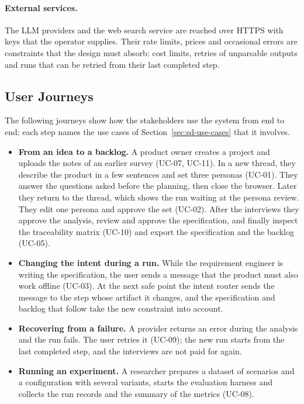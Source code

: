 \paragraph{External services.} The LLM providers and the web search service are reached over HTTPS with keys that the operator supplies. Their rate limits, prices and occasional errors are constraints that the design must absorb: cost limits, retries of unparsable outputs and runs that can be retried from their last completed step.

\subsection{User Journeys}
\label{sec:sd-journeys}
The following journeys show how the stakeholders use the system from end to end; each step names the use cases of Section~\ref{sec:sd-use-cases} that it involves.
\begin{itemize}
    \item \textbf{From an idea to a backlog.} A product owner creates a project and uploads the notes of an earlier survey (UC-07, UC-11). In a new thread, they describe the product in a few sentences and set three personas (UC-01). They answer the questions asked before the planning, then close the browser. Later they return to the thread, which shows the run waiting at the persona review. They edit one persona and approve the set (UC-02). After the interviews they approve the analysis, review and approve the specification, and finally inspect the traceability matrix (UC-10) and export the specification and the backlog (UC-05).
    \item \textbf{Changing the intent during a run.} While the requirement engineer is writing the specification, the user sends a message that the product must also work offline (UC-03). At the next safe point the intent router sends the message to the step whose artifact it changes, and the specification and backlog that follow take the new constraint into account.
    \item \textbf{Recovering from a failure.} A provider returns an error during the analysis and the run fails. The user retries it (UC-09); the new run starts from the last completed step, and the interviews are not paid for again.
    \item \textbf{Running an experiment.} A researcher prepares a dataset of scenarios and a configuration with several variants, starts the evaluation harness and collects the run records and the summary of the metrics (UC-08).
\end{itemize}
